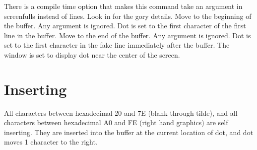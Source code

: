 \begin{cmdlist}
There is a compile time option that makes this command take an argument
in screenfulls instead of lines. Look in  for the gory details.
Move to the beginning of the buffer. Any argument is ignored.
Dot is set to the first character of the first line in the buffer.
Move to the end of the buffer. Any argument is ignored. Dot is
set to the first character in the fake line immediately after the buffer.
The window is set to display dot near the center of the screen.
\end{cmdlist}
\section{Inserting}
All characters between hexadecimal 20 and 7E (blank through tilde),
and all characters between hexadecimal A0 and FE (right hand graphics)
are self inserting. They are inserted into the buffer at the current
location of dot, and dot moves 1 character to the right.

